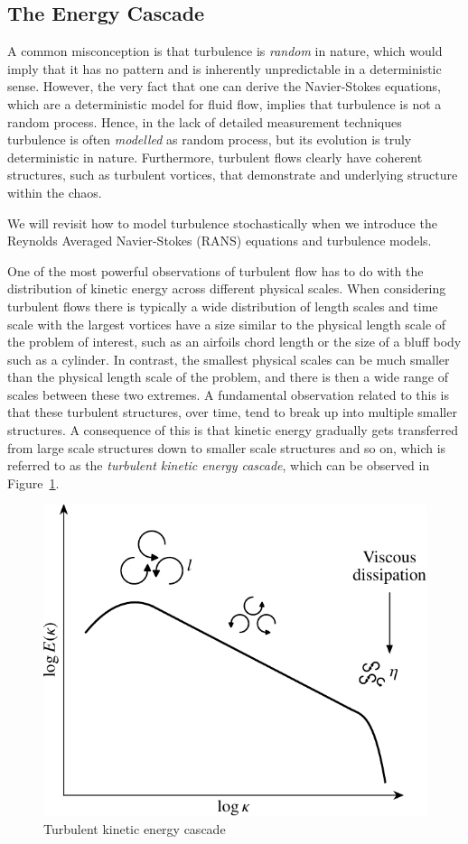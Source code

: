 \subsection{The Energy Cascade}
A common misconception is that turbulence is {\it random} in nature, which would imply that it has no pattern and is inherently unpredictable in a deterministic sense. However, the very fact that one can derive the Navier-Stokes equations, which are a deterministic model for fluid flow, implies that turbulence is not a random process. Hence, in the lack of detailed measurement techniques turbulence is often {\it modelled} as random process, but its evolution is truly deterministic in nature. Furthermore, turbulent flows clearly have coherent structures, such as turbulent vortices, that demonstrate and underlying structure within the chaos.
\begin{remark}
We will revisit how to model turbulence stochastically when we introduce the Reynolds Averaged Navier-Stokes (RANS) equations and turbulence models.
\end{remark}

One of the most powerful observations of turbulent flow has to do with the distribution of kinetic energy across different physical scales. When considering turbulent flows there is typically a wide distribution of length scales and time scale with the largest vortices have a size similar to the physical length scale of the problem of interest, such as an airfoils chord length or the size of a bluff body such as a cylinder. In contrast, the smallest physical scales can be much smaller than the physical length scale of the problem, and there is then a wide range of scales between these two extremes. A fundamental observation related to this is that these turbulent structures, over time, tend to break up into multiple smaller structures. A consequence of this is that kinetic energy gradually gets transferred from large scale structures down to smaller scale structures and so on, which is referred to as the {\it turbulent kinetic energy cascade}, which can be observed in Figure~\ref{fig:energy_cascade}.
\begin{figure}[tbp]
	\centering
	\includegraphics[width=0.5\linewidth]{Pictures/energy_cascade}
	\caption{Turbulent kinetic energy cascade}
	\label{fig:energy_cascade}
\end{figure}

